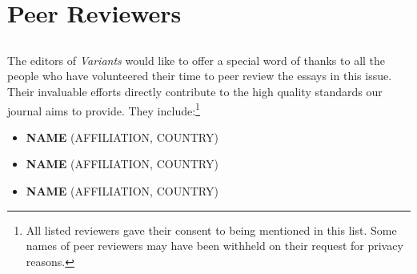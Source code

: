 \pagestyle{authors}
\chapter*{Peer Reviewers}
\protect\thispagestyle{plain.authors}


\section*{}
The editors of \emph{Variants} would like to offer a special word of thanks to all the people who have volunteered their time to peer review the essays in this issue. Their invaluable efforts directly contribute to the high quality standards our journal aims to provide. They include:\footnote{All listed reviewers gave their consent to being mentioned in this list. Some names of peer reviewers may have been withheld on their request for privacy reasons.} 

\begin{itemize}
    \item \textbf{NAME} (AFFILIATION, COUNTRY)
    \item \textbf{NAME} (AFFILIATION, COUNTRY)
    \item \textbf{NAME} (AFFILIATION, COUNTRY)
\end{itemize}
